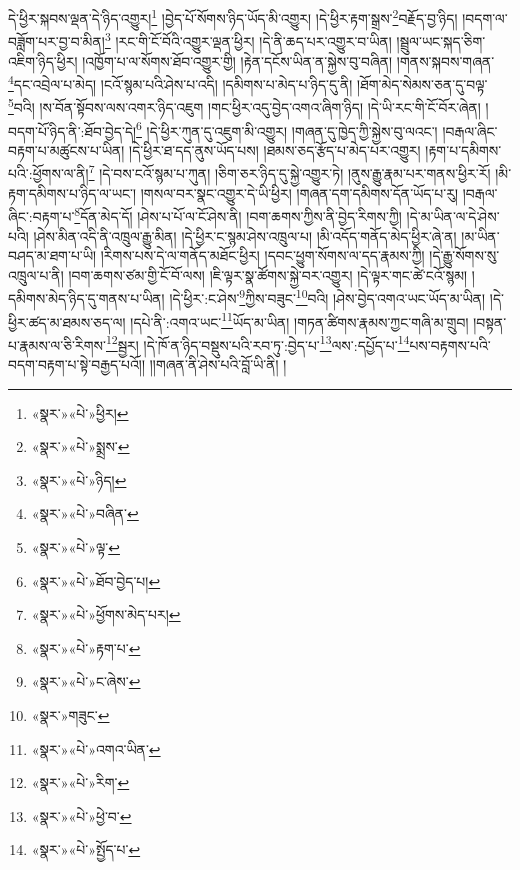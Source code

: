 དེ་ཕྱིར་སྐབས་ལྡན་དེ་ཉིད་འགྱུར།\footnote{«སྣར་»«པེ་»ཕྱིར།} །བྱེད་པོ་སོགས་ཉིད་ཡོད་མི་འགྱུར། །དེ་ཕྱིར་རྟག་སྒྲས་\footnote{«སྣར་»«པེ་»སྨྲས་}བརྗོད་བྱ་ཉིད། །བདག་ལ་བཟློག་པར་བྱ་བ་མིན།\footnote{«སྣར་»«པེ་»ཉིད།} །རང་གི་ངོ་བོའི་འགྱུར་ལྡན་ཕྱིར། །དེ་ནི་ཆད་པར་འགྱུར་བ་ཡིན། །སྦྲུལ་ཡང་སྐད་ཅིག་འཇིག་ཉིད་ཕྱིར། །འཁྱོག་པ་ལ་སོགས་ཐོབ་འགྱུར་གྱི། །རྟེན་དངོས་ཡིན་ན་སྐྱེས་བུ་བཞིན། །གནས་སྐབས་གཞན་\footnote{«སྣར་»«པེ་»བཞིན་}དང་འབྲེལ་པ་མེད། །ངའོ་སྙམ་པའི་ཤེས་པ་འདི། །དམིགས་པ་མེད་པ་ཉིད་དུ་ནི། །ཐོག་མེད་སེམས་ཅན་དུ་བལྟ་\footnote{«སྣར་»«པེ་»ལྟ་}བའི། །ས་བོན་སྟོབས་ལས་འགར་ཉིད་འཇུག །གང་ཕྱིར་འདུ་བྱེད་འགའ་ཞིག་ཉིད། །དེ་ཡི་རང་གི་ངོ་བོར་ཞེན། །བདག་པོ་ཉིད་ནི་:ཐོབ་བྱེད་དེ།\footnote{«སྣར་»«པེ་»ཐོབ་བྱེད་པ།} །དེ་ཕྱིར་ཀུན་དུ་འཇུག་མི་འགྱུར། །གཞན་དུ་ཁྱེད་ཀྱི་སྐྱེས་བུ་ལའང་། །བརྒལ་ཞིང་བརྟག་པ་མཚུངས་པ་ཡིན། །དེ་ཕྱིར་ཐ་དད་ནུས་ཡོད་པས། །ཐམས་ཅད་རྩོད་པ་མེད་པར་འགྱུར། །རྟག་པ་དམིགས་པའི་:ཕྱོགས་ལ་ནི།\footnote{«སྣར་»«པེ་»ཕྱོགས་མེད་པར།} །དེ་བས་ངའོ་སྙམ་པ་ཀུན། །ཅིག་ཅར་ཉིད་དུ་སྐྱེ་འགྱུར་ཏེ། །ནུས་རྒྱུ་རྣམ་པར་གནས་ཕྱིར་རོ། །མི་རྟག་དམིགས་པ་ཉིད་ལ་ཡང་། །གསལ་བར་སྣང་འགྱུར་དེ་ཡི་ཕྱིར། །གཞན་དག་དམིགས་དོན་ཡོད་པ་རུ། །བརྒལ་ཞིང་:བརྟག་པ་\footnote{«སྣར་»«པེ་»རྟག་པ་}དོན་མེད་དོ། །ཤེས་པ་པོ་ལ་ངོ་ཤེས་ནི། །བག་ཆགས་ཀྱིས་ནི་བྱེད་རིགས་ཀྱི། །དེ་མ་ཡིན་ལ་དེ་ཤེས་པའི། །ཤེས་མིན་འདི་ནི་འཁྲུལ་རྒྱུ་མིན། །དེ་ཕྱིར་ང་སྙམ་ཤེས་འཁྲུལ་པ། །མི་འདོད་གནོད་མེད་ཕྱིར་ཞེ་ན། །མ་ཡིན་བཤད་མ་ཐག་པ་ཡི། །རིགས་པས་དེ་ལ་གནོད་མཐོང་ཕྱིར། །དབང་ཕྱུག་སོགས་ལ་དད་རྣམས་ཀྱི། །དེ་རྒྱུ་སོགས་སུ་འཁྲུལ་པ་ནི། །བག་ཆགས་ཙམ་གྱི་ངོ་བོ་ལས། །ཇི་ལྟར་སྣ་ཚོགས་སྐྱེ་བར་འགྱུར། །དེ་ལྟར་གང་ཚེ་ངའོ་སྙམ། །དམིགས་མེད་ཉིད་དུ་གནས་པ་ཡིན། །དེ་ཕྱིར་:ང་ཤེས་\footnote{«སྣར་»«པེ་»ང་ཞེས་}ཀྱིས་བཟུང་\footnote{«སྣར་»གཟུང་}བའི། །ཤེས་བྱེད་འགའ་ཡང་ཡོད་མ་ཡིན། །དེ་ཕྱིར་ཚད་མ་ཐམས་ཅད་ལ། །དཔེ་ནི་:འགའ་ཡང་\footnote{«སྣར་»«པེ་»འགའ་ཡིན་}ཡོད་མ་ཡིན། །གཏན་ཚིགས་རྣམས་ཀྱང་གཞི་མ་གྲུབ། །བསྟན་པ་རྣམས་ལ་ཅི་རིགས་\footnote{«སྣར་»«པེ་»རིག་}སྦྱར། །དེ་ཁོ་ན་ཉིད་བསྡུས་པའི་རབ་ཏུ་:བྱེད་པ་\footnote{«སྣར་»«པེ་»ཕྱེ་བ་}ལས་:དཔྱོད་པ་\footnote{«སྣར་»«པེ་»སྤྱོད་པ་}པས་བརྟགས་པའི་བདག་བརྟག་པ་སྟེ་བརྒྱད་པའོ།། །།གཞན་ནི་ཤེས་པའི་བློ་ཡི་ནི། །
